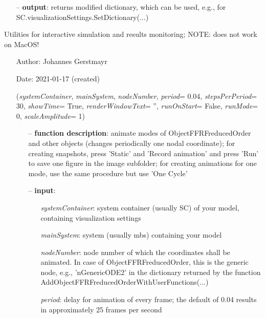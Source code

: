 \begin{itemize}[leftmargin=1.4cm]
\begin{itemize}[leftmargin=1.4cm]
\begin{itemize}[leftmargin=0.5cm]
\begin{itemize}[leftmargin=1.4cm]
\begin{itemize}[leftmargin=1.4cm]
\begin{itemize}[leftmargin=0.5cm]
\begin{itemize}[leftmargin=1.4cm]
\begin{itemize}[leftmargin=0.5cm]
\begin{itemize}[leftmargin=1.4cm]
\begin{itemize}[leftmargin=0.7cm]
\begin{itemize}[leftmargin=1.2cm]
  \end{itemize}
  \item[--]  {\bf output}: returns modified dictionary, which can be used, e.g., for SC.visualizationSettings.SetDictionary(...)\vspace{12pt}\end{itemize}
%
\label{sec:module:interactive}
  Utilities for interactive simulation and results monitoring; NOTE: does not work on MacOS!
\begin{itemize}[leftmargin=1.4cm]
\setlength{\itemindent}{-1.4cm}
\item[]Author:    Johannes Gerstmayr
\item[]Date:      2021-01-17 (created)
\ei
\begin{flushleft}
\label{sec:interactive:AnimateModes}
({\it systemContainer}, {\it mainSystem}, {\it nodeNumber}, {\it period}= 0.04, {\it stepsPerPeriod}= 30, {\it showTime}= True, {\it renderWindowText}= '', {\it runOnStart}= False, {\it runMode}= 0, {\it scaleAmplitude}= 1)
\end{flushleft}
\setlength{\itemindent}{0.7cm}
\begin{itemize}[leftmargin=0.7cm]
  \item[--]  {\bf function description}: animate modes of ObjectFFRFreducedOrder and other objects (changes periodically one nodal coordinate); for creating snapshots, press 'Static' and 'Record animation' and press 'Run' to save one figure in the image subfolder; for creating animations for one mode, use the same procedure but use 'One Cycle'  \item[--]  {\bf input}: \vspace{-6pt}
  \begin{itemize}[leftmargin=1.2cm]
\setlength{\itemindent}{-0.7cm}
    \item[] {\it systemContainer}: system container (usually SC) of your model, containing visualization settings
    \item[] {\it     mainSystem}: system (usually mbs) containing your model
    \item[] {\it     nodeNumber}: node number of which the coordinates shall be animated. In case of ObjectFFRFreducedOrder, this is the generic node, e.g., 'nGenericODE2' in the dictionary returned by the function AddObjectFFRFreducedOrderWithUserFunctions(...)
    \item[] {\it     period}: delay for animation of every frame; the default of 0.04 results in approximately 25 frames per second

\end{itemize}
\end{itemize}
\end{itemize}
\end{itemize}
\end{itemize}
\end{itemize}
\end{itemize}
\end{itemize}
\end{itemize}
\end{itemize}
\end{itemize}
\end{itemize}
